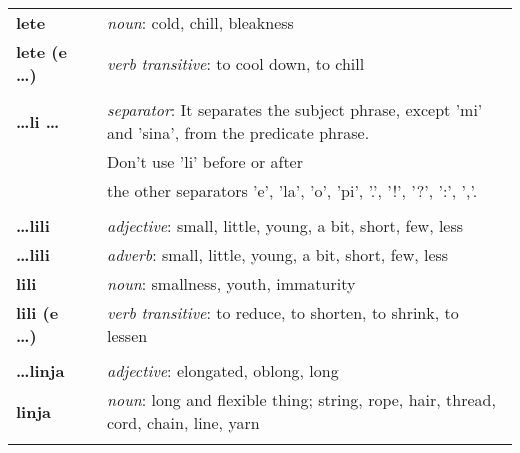 \begin{supertabular}{p{2,5cm}|ll}
    \textbf{lete}                &  & \textit{noun}: cold, chill, bleakness                                                                      \\
    \textbf{lete (e \dots)}      &  & \textit{verb transitive}: to cool down, to chill                                                           \\
                                 &  &                                                                                                            \\ %
    \textbf{\dots li \dots}      &  & \textit{separator}: It separates the subject phrase, except 'mi' and 'sina', from the predicate phrase.    \\ && Don't use 'li' before or after \\ && the other separators 'e', 'la', 'o', 'pi', '.', '!', '?', ':', ','. \\
                                 &  &                                                                                                            \\ %
    \textbf{\dots lili}          &  & \textit{adjective}: small, little, young, a bit, short, few, less                                          \\
    \textbf{\dots lili}          &  & \textit{adverb}: small, little, young, a bit, short, few, less                                             \\
    \textbf{lili}                &  & \textit{noun}: smallness, youth, immaturity                                                                \\
    \textbf{lili (e \dots)}      &  & \textit{verb transitive}: to reduce, to shorten, to shrink, to lessen                                      \\
                                 &  &                                                                                                            \\ %
    \textbf{\dots linja}         &  & \textit{adjective}: elongated, oblong, long                                                                \\
    \textbf{linja}               &  & \textit{noun}: long and flexible thing; string, rope, hair, thread, cord, chain, line, yarn                \\
                                 &  &                                                                                                            \\ %

\end{supertabular}
